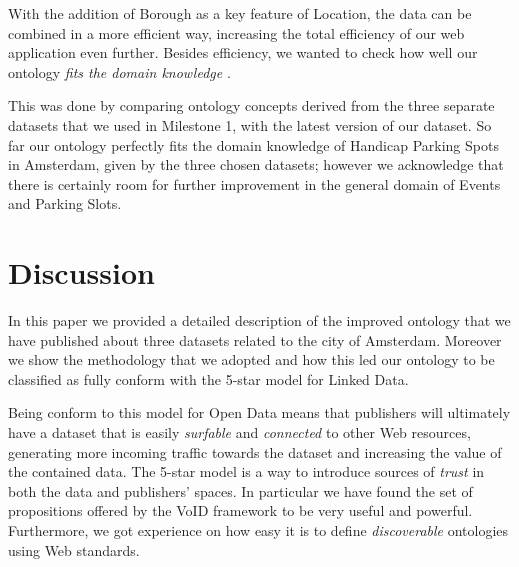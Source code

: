 \documentclass[runningheads,a4paper]{../../StyleFiles/llncs}
\begin{document}
With the addition of Borough as a key feature of Location, the data can be combined in a more efficient way, increasing the total efficiency of our web application even further. Besides efficiency, we wanted to check how well our ontology \textit{fits the domain knowledge} \cite{brewster2004data}. 

This was done by comparing ontology concepts derived from the three separate datasets that we used in Milestone 1, with the latest version of our dataset. So far our ontology perfectly fits the domain knowledge of Handicap Parking Spots in Amsterdam, given by the three chosen datasets; however we acknowledge that there is certainly room for further improvement in the general domain of Events and Parking Slots.

\section{Discussion}
In this paper we provided a detailed description of the improved ontology that we have published about three datasets related to the city of Amsterdam. Moreover we show the methodology that we adopted and how this led our ontology to be classified as fully conform with the 5-star model for Linked Data.

Being conform to this model for Open Data means that publishers will ultimately have a dataset that is easily \textit{surfable} and \textit{connected} to other Web resources, generating more incoming traffic towards the dataset and increasing the value of the contained data. The 5-star model is a way to introduce sources of \textit{trust} in both the data and publishers' spaces. In particular we have found the set of propositions offered by the VoID framework to be very useful and powerful. Furthermore, we got experience on how easy it is to define \textit{discoverable} ontologies using Web standards.




\end{document}
